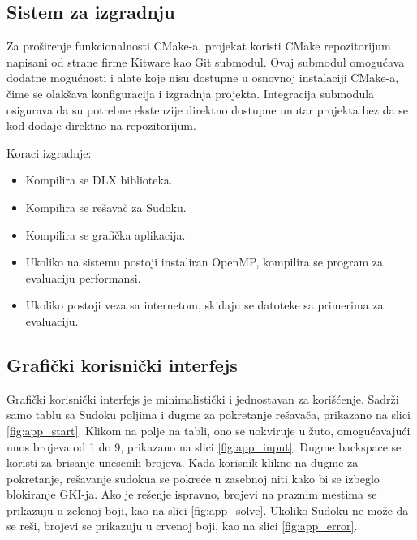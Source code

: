 \documentclass[a4paper]{article}
\begin{document}
{\subsection{Sistem za izgradnju}

Za proširenje funkcionalnosti CMake-a, projekat koristi CMake repozitorijum napisani od strane firme Kitware \cite{kitware} 
kao Git submodul.
Ovaj submodul omogućava dodatne mogućnosti i alate koje nisu dostupne u osnovnoj instalaciji CMake-a, čime se olakšava 
konfiguracija i izgradnja projekta. Integracija submodula osigurava da su potrebne ekstenzije direktno dostupne unutar
projekta bez da se kod dodaje direktno na repozitorijum.

Koraci izgradnje:

\begin{itemize}
  \item Kompilira se DLX biblioteka.
  \item Kompilira se rešavač za Sudoku.
  \item Kompilira se grafička aplikacija.
  \item Ukoliko na sistemu postoji instaliran OpenMP, kompilira se program za evaluaciju performansi.
  \item Ukoliko postoji veza sa internetom, skidaju se datoteke sa primerima za evaluaciju.
\end{itemize}

\subsection{Grafički korisnički interfejs}

Grafički korisnički interfejs je minimalistički i jednostavan za korišćenje.
Sadrži samo tablu sa Sudoku poljima i dugme za pokretanje rešavača, prikazano na slici \ref{fig:app_start}.
Klikom na polje na tabli, ono se uokviruje u žuto, omogućavajući unos brojeva od 1 do 9, prikazano na slici \ref{fig:app_input}.
Dugme backspace se koristi za brisanje unesenih brojeva.
Kada korisnik klikne na dugme za pokretanje, rešavanje sudokua se pokreće u zasebnoj niti kako bi se izbeglo blokiranje GKI-ja.
Ako je rešenje ispravno, brojevi na praznim mestima se prikazuju u zelenoj boji, kao na slici \ref{fig:app_solve}.
Ukoliko Sudoku ne može da se reši, brojevi se prikazuju u crvenoj boji, kao na slici \ref{fig:app_error}.

}
\end{document}

